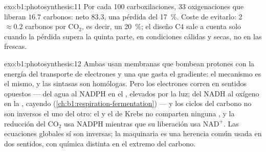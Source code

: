 \begin{solution}{exo:b1:photosynthesis:11}
Por cada 100 carboxilaciones, 33 oxigenaciones que liberan $16.7$ carbonos:
neto $83.3$, una pérdida del \qty{17}{\%}. Coste de evitarlo: 2 
$\approx
0.2$ carbonos por $\mathrm{CO_2}$, es decir, un \qty{20}{\%}; el
diseño C4 sale a cuenta solo cuando la pérdida supera la quinta parte, en
condiciones cálidas y secas, no en las frescas.
\end{solution}

\begin{solution}{exo:b1:photosynthesis:12}
Ambas usan membranas que bombean protones con la energía del transporte de
electrones y una  que gasta el gradiente: el mecanismo es el
mismo, y las sintasas son homólogas. Pero los electrones corren en sentidos
opuestos --- del agua al NADPH en el , elevados por la luz; del
NADH al oxígeno en la , cayendo
(\cref{ch:b1:respiration-fermentation}) --- y los ciclos del carbono no son
inversos el uno del otro: el  y el de Krebs no comparten
ninguna , y la reducción del $\mathrm{CO_2}$ usa NADPH mientras que su
liberación usa $\mathrm{NAD^+}$. Las ecuaciones globales sí son inversas; la
maquinaria es una herencia común usada en dos sentidos, con química distinta
en el extremo del carbono.
\end{solution}


